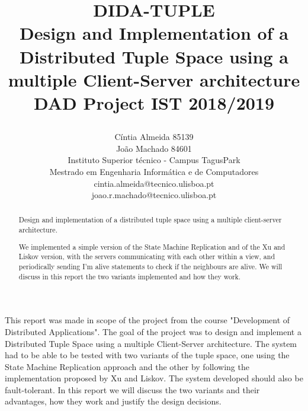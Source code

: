 \documentclass[times, 10pt,two column]{article}
\begin{document}
\title{\begin{center}
    DIDA-TUPLE\\ 
    Design and Implementation of a Distributed Tuple Space using a multiple Client-Server architecture
  \\ DAD Project IST 2018/2019       
    \end{center}}

\author{
C\'intia Almeida 85139\\Jo\~ao Machado 84601\\
Instituto Superior t\'ecnico - Campus TagusPark \\ Mestrado em Engenharia Inform\'atica e de Computadores\\
cintia.almeida@tecnico.ulisboa.pt\\joao.r.machado@tecnico.ulisboa.pt\\
}

\maketitle
\thispagestyle{empty}

\begin{abstract}

Design and implementation of a distributed tuple space using a multiple client-server architecture.

We implemented a simple version of the State Machine Replication and of the Xu and Liskov version, with the servers communicating with each other within a view, and periodically sending I'm alive statements to check if the neighbours are alive. We will discuss in this report the two variants implemented and how they work.


\end{abstract}




This report was made in scope of the project from the course "Development of Distributed Applications". The goal of the project was to design and implement a Distributed Tuple Space using a multiple Client-Server architecture. 
The system had to be able to be tested with two variants of the tuple space, one using the State Machine Replication approach and the other by following the implementation proposed by Xu and Liskov. The system developed should also be fault-tolerant. In this report we will discuss the two variants and their advantages, how they work and justify the design decisions.
\end{document}
